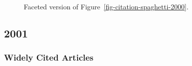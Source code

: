\documentclass[
  10pt,
  letterpaper,
  DIV=11,
  numbers=noendperiod,
  twoside]{scrartcl}
\begin{document}
\begin{figure}


\caption{\label{fig-citation-facet-2000}Faceted version of
Figure~\ref{fig-citation-spaghetti-2000}.}

\end{figure}%

\newpage

\subsection{2001}\label{sec-s2001}

\subsubsection*{Widely Cited Articles}\label{widely-cited-articles-45}
\end{document}
